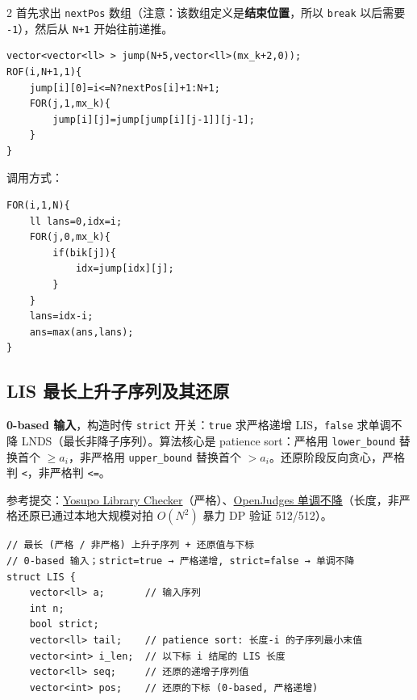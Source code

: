 \begin{multicols*}{2}
		首先求出 \texttt{nextPos} 数组（注意：该数组定义是\textbf{结束位置}，所以 \texttt{break} 以后需要 \texttt{-1}），然后从 \texttt{N+1} 开始往前递推。

		\begin{verbatim}
vector<vector<ll> > jump(N+5,vector<ll>(mx_k+2,0));
ROF(i,N+1,1){
    jump[i][0]=i<=N?nextPos[i]+1:N+1;
    FOR(j,1,mx_k){
        jump[i][j]=jump[jump[i][j-1]][j-1];
    }
}
		\end{verbatim}

		调用方式：

		\begin{verbatim}
FOR(i,1,N){
    ll lans=0,idx=i;
    FOR(j,0,mx_k){
        if(bik[j]){
            idx=jump[idx][j];
        }
    }
    lans=idx-i;
    ans=max(ans,lans);
}
		\end{verbatim}

		\subsection{LIS 最长上升子序列及其还原}

		\textbf{0-based 输入}，构造时传 \texttt{strict} 开关：\texttt{true} 求严格递增 LIS，\texttt{false} 求单调不降 LNDS（最长非降子序列）。算法核心是 patience sort：严格用 \texttt{lower\_bound} 替换首个 $\geq a_i$，非严格用 \texttt{upper\_bound} 替换首个 $> a_i$。还原阶段反向贪心，严格判 \texttt{<}，非严格判 \texttt{<=}。

		参考提交：\href{https://judge.yosupo.jp/submission/327571}{Yosupo Library Checker}（严格）、\href{https://judge.yosupo.jp/submission/370233}{OpenJudges 单调不降}（长度，非严格还原已通过本地大规模对拍 \(O(N^2)\) 暴力 DP 验证 512/512）。

		\begin{verbatim}
// 最长 (严格 / 非严格) 上升子序列 + 还原值与下标
// 0-based 输入；strict=true → 严格递增, strict=false → 单调不降
struct LIS {
    vector<ll> a;       // 输入序列
    int n;
    bool strict;
    vector<ll> tail;    // patience sort: 长度-i 的子序列最小末值
    vector<int> i_len;  // 以下标 i 结尾的 LIS 长度
    vector<ll> seq;     // 还原的递增子序列值
    vector<int> pos;    // 还原的下标 (0-based, 严格递增)


\end{verbatim}
\end{multicols*}
